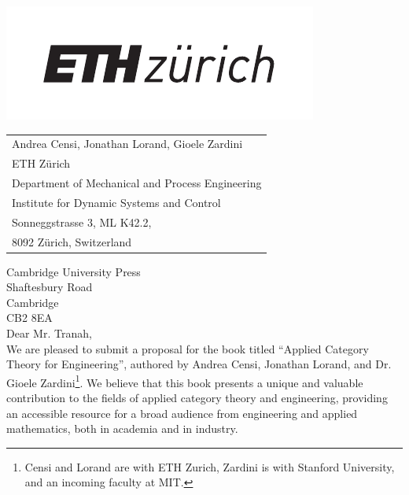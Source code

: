 \documentclass[10pt, article, one side]{memoir}
\begin{document}
    \begin{minipage}{0.45\linewidth}
        \includegraphics[width=0.9\linewidth]{pics/ethlogo.pdf}
        \vfill
    \end{minipage}
    \begin{minipage}{0.5\linewidth}
        \begin{flushright}
            \begin{tabular}{l}
                Andrea Censi, Jonathan Lorand, Gioele Zardini \\
                ETH Z\"urich \\
                Department of Mechanical and Process Engineering \\
                Institute for Dynamic Systems and Control \\
                Sonneggstrasse 3, ML K42.2, \\
                8092 Z\"urich, Switzerland
            \end{tabular}
        \end{flushright}
    \end{minipage}

    \vspace{1cm}

    \noindent Cambridge University Press\\
    \noindent Shaftesbury Road\\
    \noindent Cambridge\\
    \noindent CB2 8EA\\[+7pt]

    Dear Mr.
    Tranah,\\[-5pt]

    We are pleased to submit a proposal for the book titled ``Applied Category Theory for Engineering'', authored by 
    Andrea Censi, 
    Jonathan Lorand, and Dr.
    Gioele Zardini\footnote{Censi and Lorand are with ETH Zurich, Zardini is with Stanford University, and an incoming faculty at MIT.
    }{}.
    We believe that this book presents a unique and valuable contribution to the fields of applied category theory and engineering, providing an accessible resource for a broad audience from engineering and applied mathematics, both in academia and in industry.
    \\[-7pt]
    
\end{document}
